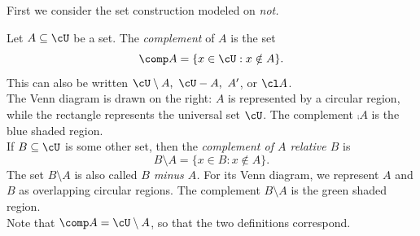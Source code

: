 \noindent\begin{minipage}{0.67\textwidth}
First we consider the set construction modeled on \emph{not.}

\begin{defn}
Let $A\subseteq\cU$ be a set. The \emph{complement} of $A$ is the set
\[\comp A=\{x\in\cU:x\notin A\}.\]
This can also be written $\cU\setminus A,\ \cU-A,\ A'$, or $\cl A$.\\

The Venn diagram is drawn on the right: $A$ is represented by a circular region, while the rectangle represents the universal set $\cU$. The complement $\comp A$ is the blue shaded region.\\

If $B\subseteq\cU$ is some other set, then the \emph{complement of $A$ relative $B$} is
\[B\setminus A=\{x\in B:x\notin A\}.\]
The set $B\setminus A$ is also called \emph{$B$ minus $A$.} For its Venn diagram, we represent $A$ and $B$ as overlapping circular regions. The complement $B\setminus A$ is the green shaded region.\\

Note that $\comp A=\cU\setminus A$, so that the two definitions correspond. 
\end{defn}
\end{minipage}\qquad
